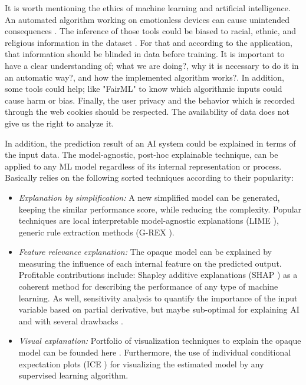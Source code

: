 It is worth mentioning the ethics of machine learning and artificial intelligence. An automated algorithm working on emotionless devices can cause unintended consequences \cite{lantz2013}. The inference of those tools could be biased to racial, ethnic, and religious information in the dataset \cite{lantz2013}. For that and according to the application, that information should be blinded in data before training. It is important to have a clear understanding of; what we are doing?, why it is necessary to do it in an automatic way?, and how the implemented algorithm works?. In addition, some tools could help; like "FairML" \cite{adebayo2016} to know which algorithmic inputs could cause harm or bias. Finally, the user privacy and the behavior which is recorded through the web cookies should be respected. The availability of data does not give us the right to analyze it. 

In addition, the prediction result of an AI system could be explained in terms of the input data. The model-agnostic, post-hoc explainable technique, can be applied to any ML model regardless of its internal representation or process. Basically relies on the following sorted techniques according to their popularity: 

  \begin{itemize}[nosep]
      \item \textit{Explanation by simplification:} A new simplified model can be generated, keeping the similar performance score, while reducing the complexity. Popular techniques are local interpretable model-agnostic explanations (LIME \citep{ribeiro2016}), generic rule extraction methods (G-REX \citep{konig2008g}).
      \item \textit{Feature relevance explanation:} The opaque model can be explained by measuring the influence of each internal feature on the predicted output. Profitable contributions include: Shapley additive explanations (SHAP \citep{lundberg2017}) as a coherent method for describing the performance of any type of machine learning. As well, sensitivity analysis \citep{samek2017} to quantify the importance of the input variable based on partial derivative, but maybe sub-optimal for explaining AI and with several drawbacks \citep{montavon2018}. 
\item \textit{Visual explanation:} Portfolio of visualization techniques to explain the opaque model can be founded here \citep{cortez2011}. Furthermore, the use of individual conditional expectation plots (ICE \citep{goldstein2015}) for visualizing the estimated model by any supervised learning algorithm. 
  \end{itemize}